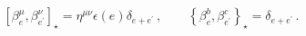 \begin{equation}
\left[ \beta _{e}^{\mu },\beta _{e^{\prime }}^{\nu }\right] _{\star }=\eta
^{\mu \nu }\epsilon(e)
\delta _{e+e^{\prime }}\,,\qquad \left\{ \beta _{e}^{b},\beta
_{e^{\prime }}^{c}\right\} _{\star }=\delta _{e+e^{\prime }}\,.
\label{osc_star}
\end{equation}%
